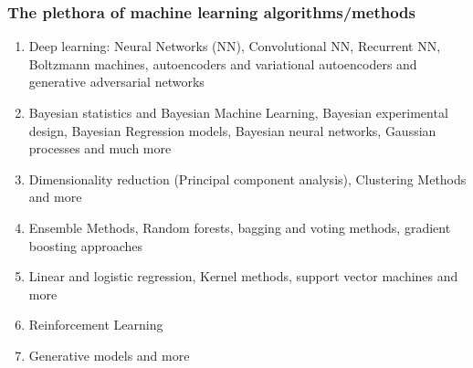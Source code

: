 \documentclass{beamer}
\begin{document}
\begin{frame}
\frametitle{The plethora  of machine learning algorithms/methods}

\begin{enumerate}
\item Deep learning: Neural Networks (NN), Convolutional NN, Recurrent NN, Boltzmann machines, autoencoders and variational autoencoders  and generative adversarial networks 

\item Bayesian statistics and Bayesian Machine Learning, Bayesian experimental design, Bayesian Regression models, Bayesian neural networks, Gaussian processes and much more

\item Dimensionality reduction (Principal component analysis), Clustering Methods and more

\item Ensemble Methods, Random forests, bagging and voting methods, gradient boosting approaches 

\item Linear and logistic regression, Kernel methods, support vector machines and more

\item Reinforcement Learning 

\item Generative models and more
\end{enumerate}

\noindent
\end{frame}
\end{document}
